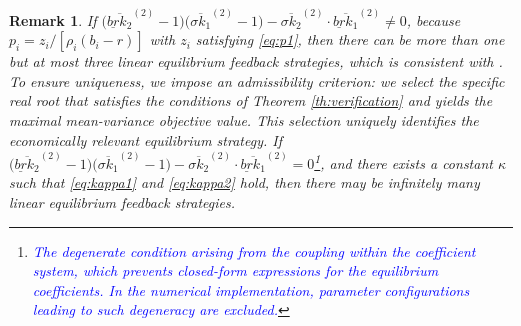 \documentclass[11pt]{article}
\newtheorem{remark}{Remark}[section]
\newenvironment{bluepar}
{\begingroup\color{blue}}
{\endgroup}
\numberwithin{equation}{section}
\newcommand{\blue}[1]{\textcolor{blue}{#1}}
\begin{document}
\begin{remark}\label{remark:2.5}
If \(\big(\overline{\underline{br}k_2}^{(2)}-1\big)\big(\overline{\sigma k_1}^{(2)}-1\big)-\overline{\sigma k_2}^{(2)}\cdot\overline{\underline{br}k_1}^{(2)}\neq 0\), because \(p_i=z_i/[\rho_i(b_i-r)]\) with \(z_i\) satisfying \eqref{eq:p1}, then there can be more than one but at most three linear equilibrium feedback strategies,
\begin{bluepar}
which is consistent with \citet{landriault2018equilibrium}. To ensure uniqueness, we impose an admissibility criterion: we select the specific real root that satisfies the conditions of Theorem \ref{th:verification} and yields the  maximal mean-variance objective value. This selection uniquely identifies the economically relevant equilibrium strategy.
\end{bluepar}
If \(\big(\overline{\underline{br}k_2}^{(2)}-1\big)\big(\overline{\sigma k_1}^{(2)}-1\big)-\overline{\sigma k_2}^{(2)}\cdot\overline{\underline{br}k_1}^{(2)}= 0\)\footnote{\blue{The degenerate condition arising from the coupling within the coefficient system, which prevents closed-form expressions for the equilibrium  coefficients. In the numerical implementation, parameter configurations leading to such degeneracy are excluded.}}, and there exists a constant \(\kappa\) such that \eqref{eq:kappa1} and \eqref{eq:kappa2} hold, then there may be infinitely many linear equilibrium feedback strategies.
\end{remark}
\end{document}
